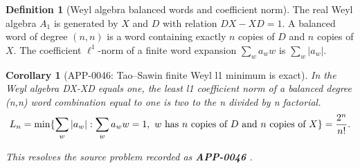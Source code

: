 \documentclass[11pt]{article}
\numberwithin{equation}{section}
\newtheorem{corollary}[theorem]{Corollary}
\theoremstyle{definition}
\newtheorem{definition}{Definition}[section]
\theoremstyle{remark}
\newcommand{\1}{\mathbf 1}
\begin{document}
\begin{definition}[Weyl algebra balanced words and coefficient norm]
\label{res:weyl-algebra-balanced-word-language}
The real Weyl algebra \(A_1\) is generated by \(X\) and \(D\) with relation \(DX-XD=1\). A balanced word of degree \((n,n)\) is a word containing exactly \(n\) copies of \(D\) and \(n\) copies of \(X\). The coefficient \(\ell^1\)-norm of a finite word expansion \(\sum_w a_w w\) is \(\sum_w |a_w|\).
\end{definition}

\begin{corollary}[APP-0046: Tao--Sawin finite Weyl l1 minimum is exact]
\label{res:tao-sawin-weyl-l1-exact-minimum}
In the Weyl algebra DX-XD equals one, the least l1 coefficient norm of a balanced degree (n,n) word combination equal to one is two to the n divided by n factorial.
\[
L_n=\min\{\sum_w |a_w|:\sum_w a_w w=1,\ w\hbox{ has }n\hbox{ copies of }D\hbox{ and }n\hbox{ copies of }X\}=\frac{2^n}{n!}.
\]



This resolves the source problem recorded as \textbf{APP-0046} \cite{app-app-0046-source}.
\end{corollary}
\end{document}
